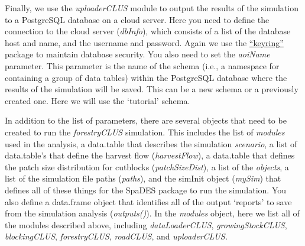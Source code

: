 \documentclass[
]{article}
\begin{document}
Finally, we use the \emph{uploaderCLUS} module to output the results of
the simulation to a PostgreSQL database on a cloud server. Here you need
to define the connection to the cloud server (\emph{dbInfo}), which
consists of a list of the database host and name, and the username and
password. Again we use the
\href{https://cran.r-project.org/web/packages/keyring/keyring.pdf}{``keyring''}
package to maintain database security. You also need to set the
\emph{aoiName} parameter. This parameter is the name of the schema
(i.e., a namespace for containing a group of data tables) within the
PostgreSQL database where the results of the simulation will be saved.
This can be a new schema or a previously created one. Here we will use
the `tutorial' schema.

In addition to the list of parameters, there are several objects that
need to be created to run the \emph{forestryCLUS} simulation. This
includes the list of \emph{modules} used in the analysis, a data.table
that describes the simulation \emph{scenario}, a list of data.table's
that define the harvest flow (\emph{harvestFlow}), a data.table that
defines the patch size distribution for cutblocks
(\emph{patchSizeDist}), a list of the \emph{objects}, a list of the
simulation file paths (\emph{paths}), and the simInit object
(\emph{mySim}) that defines all of these things for the SpaDES package
to run the simulation. You also define a data.frame object that
identifies all of the output `reports' to save from the simulation
analysis (\emph{outputs()}). In the \emph{modules} object, here we list
all of the modules described above, including \emph{dataLoaderCLUS},
\emph{growingStockCLUS}, \emph{blockingCLUS}, \emph{forestryCLUS},
\emph{roadCLUS}, and \emph{uploaderCLUS.}
\end{document}

